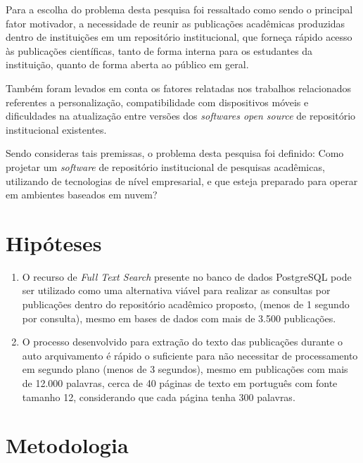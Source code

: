Para a escolha do problema desta pesquisa foi ressaltado como sendo
o principal fator motivador, a necessidade de reunir as publicações acadêmicas
produzidas dentro de instituições em um repositório institucional,
que forneça rápido acesso às publicações científicas,
tanto de forma interna para os estudantes da instituição,
quanto de forma aberta ao público em geral.

Também foram levados em conta os fatores relatadas nos trabalhos
relacionados referentes a personalização, compatibilidade com
dispositivos móveis e dificuldades na atualização entre versões
dos \emph{softwares open source} de repositório institucional existentes.

Sendo consideras tais premissas, o problema desta pesquisa foi definido:
Como projetar um \emph{software} de repositório institucional de pesquisas
acadêmicas, utilizando de tecnologias de nível empresarial, e que esteja
preparado para operar em ambientes baseados em nuvem?

\section{Hipóteses} \label{sec::Hypothesis}

\begin{enumerate}
    \item O recurso de \emph{Full Text Search} presente no banco de dados PostgreSQL
          pode ser utilizado como uma alternativa viável para realizar
          as consultas por publicações dentro do repositório acadêmico
          proposto, (menos de 1 segundo por consulta), mesmo em bases de
          dados com mais de 3.500 publicações.

    \item O processo desenvolvido para extração do texto das publicações
          durante o auto arquivamento é rápido o suficiente para não
          necessitar de processamento em segundo plano (menos de 3 segundos),
          mesmo em publicações com mais de 12.000 palavras, cerca de 40 páginas
          de texto em português com fonte tamanho 12, considerando que cada página tenha
          300 palavras.

\end{enumerate}

\section{Metodologia} \label{sec:Methodology}

